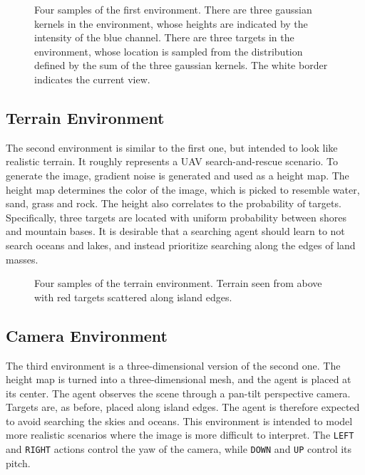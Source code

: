 
\begin{figure}
    \centering
    
    \label{fig:gaussian}
    \caption[Gaussian environment]{Four samples of the first environment. There are three gaussian kernels in the environment, whose heights are indicated by the intensity of the blue channel. There are three targets in the environment, whose location is sampled from the distribution defined by the sum of the three gaussian kernels. The white border indicates the current view.}
\end{figure}

\subsection{Terrain Environment}

The second environment is similar to the first one, but intended to look like realistic terrain.
It roughly represents a UAV search-and-rescue scenario.
To generate the image, gradient noise is generated and used as a height map.
The height map determines the color of the image, which is picked to resemble water, sand, grass and rock.
The height also correlates to the probability of targets.
Specifically, three targets are located with uniform probability between shores and mountain bases.
It is desirable that a searching agent should learn to not search oceans and lakes, and instead prioritize searching along the edges of land masses.

\begin{figure}
    \centering
    
    \label{fig:terrain}
    \caption[Terrain environment]{Four samples of the terrain environment. Terrain seen from above with red targets scattered along island edges.}
\end{figure}

\subsection{Camera Environment}

The third environment is a three-dimensional version of the second one.
The height map is turned into a three-dimensional mesh, and the agent is placed at its center.
The agent observes the scene through a pan-tilt perspective camera.
Targets are, as before, placed along island edges.
The agent is therefore expected to avoid searching the skies and oceans.
This environment is intended to model more realistic scenarios where the image is more difficult to interpret.
The \texttt{LEFT} and \texttt{RIGHT} actions control the yaw of the camera, while \texttt{DOWN} and \texttt{UP} control its pitch.

